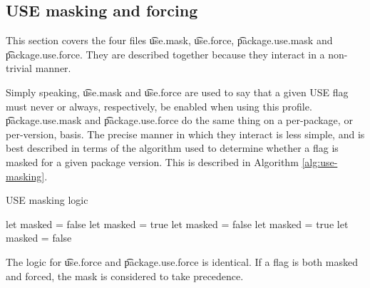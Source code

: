 \subsection{USE masking and forcing}
\label{use-masking}
This section covers the four files \t{use.mask}, \t{use.force}, \t{package.use.mask} and
\t{package.use.force}. They are described together because they interact in a non-trivial manner.

Simply speaking, \t{use.mask} and \t{use.force} are used to say that a given USE flag must never or
always, respectively, be enabled when using this profile. \t{package.use.mask} and
\t{package.use.force} do the same thing on a per-package, or per-version, basis. The precise manner
in which they interact is less simple, and is best described in terms of the algorithm used to
determine whether a flag is masked for a given package version. This is described in Algorithm
\ref{alg:use-masking}.
\begin{algorithm}
\caption{USE masking logic} \label{alg:use-masking}
\begin{algorithmic}[1]
\STATE let masked = false
        \STATE let masked = true
        \STATE let masked = false
    \ENDIF
            \STATE let masked = true
            \STATE let masked = false
        \ENDIF
    \ENDFOR
\ENDFOR
\end{algorithmic}
\end{algorithm}

The logic for \t{use.force} and \t{package.use.force} is identical. If a flag is both masked and
forced, the mask is considered to take precedence.



